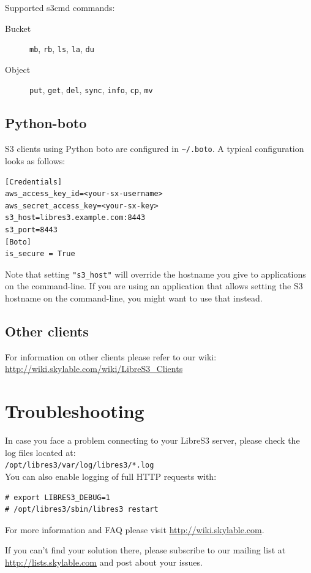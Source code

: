 Supported s3cmd commands:
\begin{description}
    \item[Bucket] \verb|mb|, \verb|rb|, \verb|ls|, \verb|la|, \verb|du|
    \item[Object] \verb|put|, \verb|get|, \verb|del|, \verb|sync|, \verb|info|,
        \verb|cp|, \verb|mv|
\end{description}

\section*{Python-boto}

S3 clients using Python boto are configured in \verb|~/.boto|.
A typical configuration looks as follows:
\small
\begin{lstlisting}
[Credentials]
aws_access_key_id=<your-sx-username>
aws_secret_access_key=<your-sx-key>
s3_host=libres3.example.com:8443
s3_port=8443
[Boto]
is_secure = True
\end{lstlisting}
\LARGE

Note that setting \verb|"s3_host"| will override the hostname you give to
applications on the command-line. If you are using an application that allows
setting the S3 hostname on the command-line, you might want to use that instead.

\section*{Other clients}
For information on other clients please refer to our wiki:
\url{http://wiki.skylable.com/wiki/LibreS3_Clients}

\chapter{Troubleshooting}
In case you face a problem connecting to your LibreS3 server, please check
the log files located at:\\ \verb|/opt/libres3/var/log/libres3/*.log|\\
You can also enable logging of full HTTP requests with:
\small
\begin{lstlisting}
# export LIBRES3_DEBUG=1
# /opt/libres3/sbin/libres3 restart
\end{lstlisting}
\LARGE
For more information and FAQ please visit \url{http://wiki.skylable.com}.

If you can't find your solution there, please subscribe to our mailing list
at \url{http://lists.skylable.com} and post about your issues.

